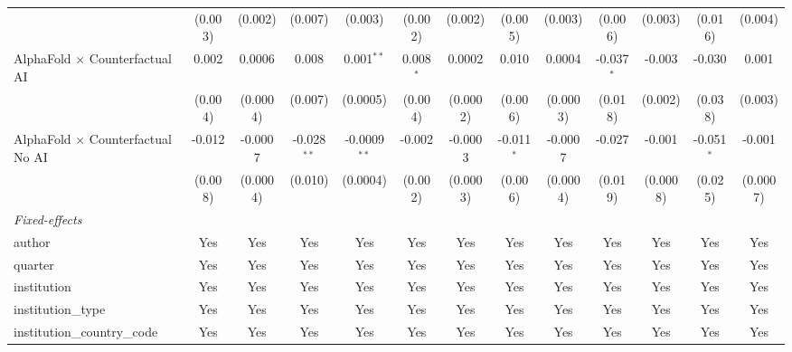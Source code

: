 \begin{tabular}{lcccccccccccc}
                                            & (0.003)      & (0.002)     & (0.007)       & (0.003)        & (0.002)     & (0.002)       & (0.005)      & (0.003)      & (0.006)      & (0.003)  & (0.016)      & (0.004)\\   
   AlphaFold $\times$ Counterfactual AI     & 0.002        & 0.0006      & 0.008         & 0.001$^{**}$   & 0.008$^{*}$ & 0.0002        & 0.010        & 0.0004       & -0.037$^{*}$ & -0.003   & -0.030       & 0.001\\   
                                            & (0.004)      & (0.0004)    & (0.007)       & (0.0005)       & (0.004)     & (0.0002)      & (0.006)      & (0.0003)     & (0.018)      & (0.002)  & (0.038)      & (0.003)\\   
   AlphaFold $\times$ Counterfactual No AI  & -0.012       & -0.0007     & -0.028$^{**}$ & -0.0009$^{**}$ & -0.002      & -0.0003       & -0.011$^{*}$ & -0.0007      & -0.027       & -0.001   & -0.051$^{*}$ & -0.001\\   
                                            & (0.008)      & (0.0004)    & (0.010)       & (0.0004)       & (0.002)     & (0.0003)      & (0.006)      & (0.0004)     & (0.019)      & (0.0008) & (0.025)      & (0.0007)\\   
   \midrule
   \emph{Fixed-effects}\\
   author                                   & Yes          & Yes         & Yes           & Yes            & Yes         & Yes           & Yes          & Yes          & Yes          & Yes      & Yes          & Yes\\  
   quarter                                  & Yes          & Yes         & Yes           & Yes            & Yes         & Yes           & Yes          & Yes          & Yes          & Yes      & Yes          & Yes\\  
   institution                              & Yes          & Yes         & Yes           & Yes            & Yes         & Yes           & Yes          & Yes          & Yes          & Yes      & Yes          & Yes\\  
   institution\_type                        & Yes          & Yes         & Yes           & Yes            & Yes         & Yes           & Yes          & Yes          & Yes          & Yes      & Yes          & Yes\\  
   institution\_country\_code               & Yes          & Yes         & Yes           & Yes            & Yes         & Yes           & Yes          & Yes          & Yes          & Yes      & Yes          & Yes\\  

\end{tabular}
